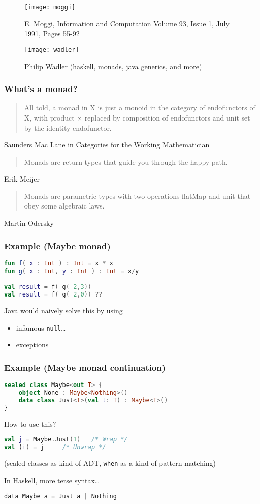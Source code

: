 \documentclass[10pt]{beamer}
\begin{document}
\begin{frame}
	\begin{figure}
		\centering
		\texttt{[image: moggi]}
		\caption{E. Moggi, Information and Computation
		Volume 93, Issue 1, July 1991, Pages 55-92}
	\end{figure}
\end{frame}
\begin{frame}
	\begin{figure}
		\centering
		\texttt{[image: wadler]}
		\caption{Philip Wadler (haskell, monads, java generics, and more)}
	\end{figure}
\end{frame}
\begin{frame}\frametitle{What's a monad?}
	\begin{quotation}
		All told, a monad in X is just a monoid in the category of endofunctors of X, with product × replaced by composition of endofunctors and unit set by the identity endofunctor.
	\end{quotation}
	 Saunders Mac Lane in Categories for the Working Mathematician
	\begin{quotation}
		Monads are return types that guide you through the happy path.
	\end{quotation}
	Erik Meijer
	\begin{quotation}
Monads are parametric types with two operations flatMap and unit that obey some algebraic laws.
	\end{quotation}
	Martin Odersky
\end{frame}
\begin{frame}[fragile]
\frametitle{Example (Maybe monad)}
\begin{lstlisting}[language=Kotlin, basicstyle=\ttfamily]
fun f( x : Int ) : Int = x * x
fun g( x : Int, y : Int ) : Int = x/y

val result = f( g( 2,3))
val result = f( g( 2,0)) ??
\end{lstlisting}
Java would naively solve this by using 
	\begin{itemize}
	\item infamous \verb|null|\ldots 
	\item exceptions
	\end{itemize}
\end{frame}
\begin{frame}[fragile]
\frametitle{Example (Maybe monad continuation)}
\begin{lstlisting}[language=Kotlin, basicstyle=\ttfamily]
sealed class Maybe<out T> {
    object None : Maybe<Nothing>()
    data class Just<T>(val t: T) : Maybe<T>()
}
\end{lstlisting}
How to use this?
\begin{lstlisting}[language=Kotlin, basicstyle=\ttfamily]
val j = Maybe.Just(1) 	/* Wrap */
val (i) = j		/* Unwrap */	
\end{lstlisting}
(sealed classes as kind of ADT, \verb|when| as a kind of pattern matching)

In Haskell, more terse syntax\ldots 
\begin{lstlisting}
data Maybe a = Just a | Nothing
\end{lstlisting}
\end{frame}
\end{document}
